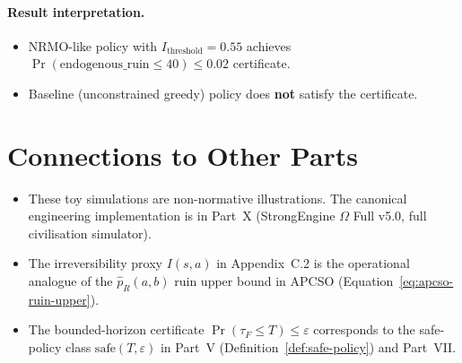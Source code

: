 \paragraph{Result interpretation.}

\begin{itemize}
\item NRMO-like policy with $I_{\mathrm{threshold}} = 0.55$ achieves
$\Pr(\mathrm{endogenous\_ruin} \le 40) \le 0.02$ certificate.
\item Baseline (unconstrained greedy) policy does \textbf{not}
satisfy the certificate.
\end{itemize}

\section*{Connections to Other Parts}

\begin{itemize}
\item These toy simulations are non-normative illustrations. The
canonical engineering implementation is in Part~X
(StrongEngine $\Omega$ Full v5.0, full civilisation simulator).
\item The irreversibility proxy $I(s, a)$ in Appendix~C.2 is the
operational analogue of the $\widehat{p}_R(a, b)$ ruin upper
bound in APCSO (Equation~\ref{eq:apcso-ruin-upper}).
\item The bounded-horizon certificate $\Pr(\tau_F \le T) \le
\varepsilon$ corresponds to the safe-policy class
$\mathrm{safe}(T, \varepsilon)$ in Part~V
(Definition~\ref{def:safe-policy}) and Part~VII.
\end{itemize}
